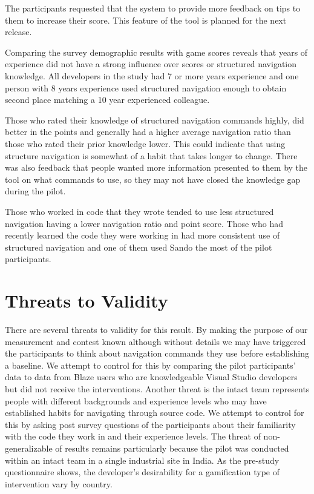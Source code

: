 \documentclass{sig-alternate}
\begin{document}
The participants requested that the system to provide more feedback on tips to them to increase their score. This feature of the tool is planned for the next release.    

Comparing the survey demographic results with game scores reveals that years of experience did not have a strong influence over scores or structured navigation knowledge.  All developers in the study had 7 or more years experience and one person with 8 years experience used structured navigation enough to obtain second place matching a 10 year experienced colleague.    

Those who rated their knowledge of structured navigation commands highly, did better in the points and generally had a higher average navigation ratio than those who rated their prior knowledge lower.  This could indicate that using structure navigation is somewhat of a habit that takes longer to change.  There was also feedback that people wanted more information presented to them by the tool on what commands to use, so they may not have closed the knowledge gap during the pilot.  

Those who worked in code that they wrote tended to use less structured navigation having a lower navigation ratio and point score.  Those who had recently learned the code they were working in had more consistent use of structured navigation and one of them used Sando the most of the pilot participants.

\section{Threats to Validity}
There are several threats to validity for this result.  By making the purpose of our measurement and contest known although without details we may have triggered the participants to think about navigation commands they use before establishing a baseline.  We attempt to control for this by comparing the pilot participants' data to data from Blaze users who are knowledgeable Visual Studio developers but did not receive the interventions.  Another threat is the intact team represents people with different backgrounds and experience levels who may have established habits for navigating through source code.  We attempt to control for this by asking post survey questions of the participants about their familiarity with the code they work in and their experience levels.  The threat of non- generalizable of results remains particularly because the pilot was conducted within an intact team in a single industrial site in India. As the pre-study questionnaire shows, the developer's desirability for a gamification type of intervention vary by country.
\end{document}
